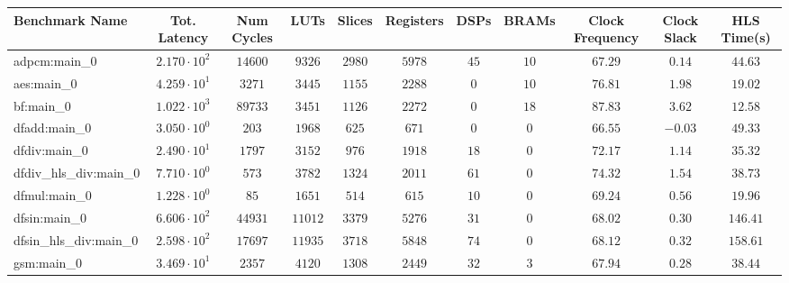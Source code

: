 \begin{tabular}{|l|c|c|c|c|c|c|c|c|c|c|}
\hline
Benchmark Name          & Tot. Latency           & Num Cycles & LUTs      & Slices    & Registers & DSPs    & BRAMs   & Clock Frequency & Clock Slack & HLS Time(s) \\
\hline
adpcm:main\_0           & $ 2.170 \cdot 10^{2} $ & $ 14600  $ & $ 9326  $ & $ 2980  $ & $ 5978  $ & $ 45  $ & $ 10  $ & $ 67.29       $ & $ 0.14    $ & $ 44.63   $ \\
aes:main\_0             & $ 4.259 \cdot 10^{1} $ & $ 3271   $ & $ 3445  $ & $ 1155  $ & $ 2288  $ & $ 0   $ & $ 10  $ & $ 76.81       $ & $ 1.98    $ & $ 19.02   $ \\
bf:main\_0              & $ 1.022 \cdot 10^{3} $ & $ 89733  $ & $ 3451  $ & $ 1126  $ & $ 2272  $ & $ 0   $ & $ 18  $ & $ 87.83       $ & $ 3.62    $ & $ 12.58   $ \\
dfadd:main\_0           & $ 3.050 \cdot 10^{0} $ & $ 203    $ & $ 1968  $ & $ 625   $ & $ 671   $ & $ 0   $ & $ 0   $ & $ 66.55       $ & $ -0.03   $ & $ 49.33   $ \\
dfdiv:main\_0           & $ 2.490 \cdot 10^{1} $ & $ 1797   $ & $ 3152  $ & $ 976   $ & $ 1918  $ & $ 18  $ & $ 0   $ & $ 72.17       $ & $ 1.14    $ & $ 35.32   $ \\
dfdiv\_hls\_div:main\_0 & $ 7.710 \cdot 10^{0} $ & $ 573    $ & $ 3782  $ & $ 1324  $ & $ 2011  $ & $ 61  $ & $ 0   $ & $ 74.32       $ & $ 1.54    $ & $ 38.73   $ \\
dfmul:main\_0           & $ 1.228 \cdot 10^{0} $ & $ 85     $ & $ 1651  $ & $ 514   $ & $ 615   $ & $ 10  $ & $ 0   $ & $ 69.24       $ & $ 0.56    $ & $ 19.96   $ \\
dfsin:main\_0           & $ 6.606 \cdot 10^{2} $ & $ 44931  $ & $ 11012 $ & $ 3379  $ & $ 5276  $ & $ 31  $ & $ 0   $ & $ 68.02       $ & $ 0.30    $ & $ 146.41  $ \\
dfsin\_hls\_div:main\_0 & $ 2.598 \cdot 10^{2} $ & $ 17697  $ & $ 11935 $ & $ 3718  $ & $ 5848  $ & $ 74  $ & $ 0   $ & $ 68.12       $ & $ 0.32    $ & $ 158.61  $ \\
gsm:main\_0             & $ 3.469 \cdot 10^{1} $ & $ 2357   $ & $ 4120  $ & $ 1308  $ & $ 2449  $ & $ 32  $ & $ 3   $ & $ 67.94       $ & $ 0.28    $ & $ 38.44   $ \\

\end{tabular}
